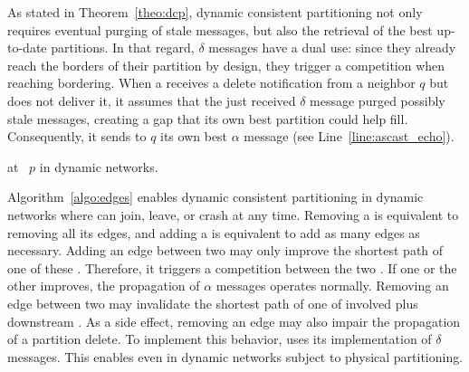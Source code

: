 As stated in Theorem~\ref{theo:dcp}, dynamic consistent partitioning
not only requires eventual purging of stale messages, but also the
retrieval of the best up-to-date partitions.  In that regard, $\delta$
messages have a dual use: since they already reach the borders of
their partition by design, they trigger a competition when reaching
bordering.  When a \process receives a delete notification from a
neighbor $q$ but does not deliver it, it assumes that the just
received $\delta$ message purged possibly stale messages, creating a
gap that its own best partition could help fill. Consequently, it
sends to $q$ its own best $\alpha$ message (see
Line~\ref{line:ascast_echo}).

\begin{algorithm}
  
  \caption{\label{algo:edges}\NAME at \Process~$p$ in dynamic networks.}
\end{algorithm}

Algorithm~\ref{algo:edges} enables dynamic consistent partitioning in
dynamic networks where \processes can join, leave, or crash at any
time. Removing a \process is equivalent to removing all its edges, and
adding a \process is equivalent to add as many edges as necessary.
Adding an edge between two \processes may only improve the shortest
path of one of these \processes. Therefore, it triggers a competition
between the two \processes. If one or the other \process improves, the
propagation of $\alpha$ messages operates normally.  Removing an edge
between two \processes may invalidate the shortest path of one of
involved \processes plus downstream \processes. As a side effect,
removing an edge may also impair the propagation of a partition
delete. To implement this behavior, \NAME uses its implementation of
$\delta$ messages. This enables \NAME even in dynamic networks subject
to physical partitioning.

